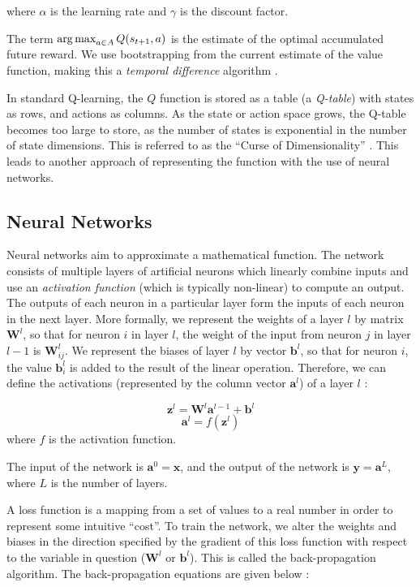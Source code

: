 where $\alpha$ is the learning rate and $\gamma$ is the discount factor.

The term $\operatorname*{arg\,max}_{a \in A}Q(s_{t+1},a)$ is the estimate of the optimal accumulated future reward. We use bootstrapping from the current estimate of the value function, making this a \textit{temporal difference} algorithm \cite{RLAnIntro}.

In standard Q-learning, the $Q$ function is stored as a table (a \textit{Q-table}) with states as rows, and actions as columns. As the state or action space grows, the Q-table becomes too large to store, as the number of states is exponential in the number of state dimensions. This is referred to as the ``Curse of Dimensionality'' \cite{cod}. This leads to another approach of representing the function with the use of neural networks.


\subsection{Neural Networks}

Neural networks aim to approximate a mathematical function. The network consists of multiple layers of artificial neurons which linearly combine inputs and use an \textit{activation function} (which is typically non-linear) to compute an output. The outputs of each neuron in a particular layer form the inputs of each neuron in the next layer. More formally, we represent the weights of a layer $l$ by matrix $\boldsymbol{W}^l$, so that for neuron $i$ in layer $l$, the weight of the input from neuron $j$ in layer $l-1$ is $\boldsymbol{W}^l_{ij}$. We represent the biases of layer $l$ by vector $\boldsymbol{b}^l$, so that for neuron $i$, the value $\boldsymbol{b}^l_i$ is added to the result of the linear operation. Therefore, we can define the activations (represented by the column vector $\boldsymbol{a}^{l}$) of a layer $l$ \cite{csmlnotes}:

\[
\boldsymbol{z}^l = \boldsymbol{W}^l \boldsymbol{a}^{l-1} + \boldsymbol{b}^l
\]
\[
\boldsymbol{a}^{l} = f(\boldsymbol{z}^{l})
\]
where $f$ is the activation function.

The input of the network is $\boldsymbol{a}^0 = \boldsymbol{x}$, and the output of the network is $\boldsymbol{y} = \boldsymbol{a}^L$, where $L$ is the number of layers.

A loss function is a mapping from a set of values to a real number in order to represent some intuitive ``cost''. To train the network, we alter the weights and biases in the direction specified by the gradient of this loss function with respect to the variable in question ($\boldsymbol{W}^l$ or $\boldsymbol{b}^l$). This is called the back-propagation algorithm. The back-propagation equations are given below \cite{csmlnotes}:

